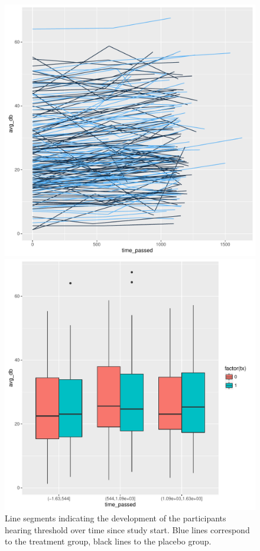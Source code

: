 \documentclass[paper=a4, fontsize=11pt]{scrartcl} %
\numberwithin{equation}{section} %
\numberwithin{figure}{section} %
\numberwithin{table}{section} %
\begin{document}
\begin{figure}[H]
  \centering
  \begin{minipage}[b]{0.38\textwidth}
    \includegraphics[width=\textwidth]{./rcode/plots/longitudinal}
    \caption{Line segments indicating the development of the participants hearing threshold over time since study start. Blue lines correspond to the treatment group, black lines to the placebo group.}
    \label{fig:spaghetti_plot}
  \end{minipage}
  \hfill
  \begin{minipage}[b]{0.38\textwidth}
    \includegraphics[width=\textwidth]{./rcode/plots/longitudinal_box}

\end{minipage}
\end{figure}
\end{document}
